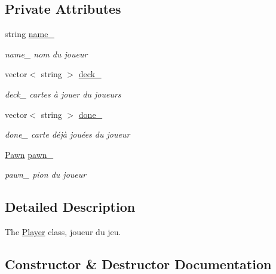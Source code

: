 \subsection*{Private Attributes}
\begin{DoxyCompactItemize}
\item 
\mbox{\label{class_player_a46357f02330630bb2160a357936c1fda}} 
string \mbox{\hyperlink{class_player_a46357f02330630bb2160a357936c1fda}{name\+\_\+}}
\begin{DoxyCompactList}\small\item\em name\+\_\+ nom du joueur \end{DoxyCompactList}\item 
\mbox{\label{class_player_a8a84e7c29d0a346e3a39315eb6c9e124}} 
vector$<$ string $>$ \mbox{\hyperlink{class_player_a8a84e7c29d0a346e3a39315eb6c9e124}{deck\+\_\+}}
\begin{DoxyCompactList}\small\item\em deck\+\_\+ cartes à jouer du joueurs \end{DoxyCompactList}\item 
\mbox{\label{class_player_a7acaa1fb49ba7ed6541f2b5c7aea28af}} 
vector$<$ string $>$ \mbox{\hyperlink{class_player_a7acaa1fb49ba7ed6541f2b5c7aea28af}{done\+\_\+}}
\begin{DoxyCompactList}\small\item\em done\+\_\+ carte déjà jouées du joueur \end{DoxyCompactList}\item 
\mbox{\label{class_player_a1cff32c338c37a14a09b7d63f404a431}} 
\mbox{\hyperlink{class_pawn}{Pawn}} \mbox{\hyperlink{class_player_a1cff32c338c37a14a09b7d63f404a431}{pawn\+\_\+}}
\begin{DoxyCompactList}\small\item\em pawn\+\_\+ pion du joueur \end{DoxyCompactList}\end{DoxyCompactItemize}


\subsection{Detailed Description}
The \mbox{\hyperlink{class_player}{Player}} class, joueur du jeu. 

\subsection{Constructor \& Destructor Documentation}
\mbox{\label{class_player_adfc9eb0b7f33b7b4f26a329cf2b88753}} 
